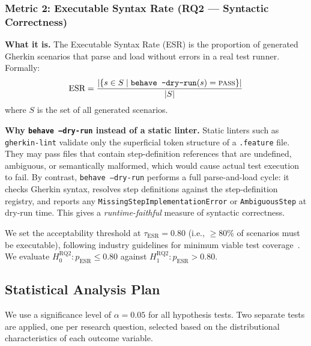 \subsubsection{Metric 2: Executable Syntax Rate (RQ2 — Syntactic Correctness)}
\label{sec:metric-esr}

\textbf{What it is.}
The Executable Syntax Rate (ESR) is the proportion of generated Gherkin scenarios that
parse and load without errors in a real test runner.
Formally:
\begin{equation}
  \text{ESR} = \frac{|\{s \in S \mid \texttt{behave --dry-run}(s) = \textsc{pass}\}|}{|S|}
\label{eq:esr}
\end{equation}
where $S$ is the set of all generated scenarios.

\textbf{Why \texttt{behave --dry-run} instead of a static linter.}
Static linters such as \texttt{gherkin-lint} validate only the superficial token structure
of a \texttt{.feature} file.
They may pass files that contain step-definition references that are undefined, ambiguous,
or semantically malformed, which would cause actual test execution to fail.
By contrast, \texttt{behave --dry-run} performs a full parse-and-load cycle: it checks
Gherkin syntax, resolves step definitions against the step-definition registry, and reports
any \texttt{MissingStepImplementationError} or \texttt{AmbiguousStep} at dry-run time.
This gives a \emph{runtime-faithful} measure of syntactic correctness.

We set the acceptability threshold at $\tau_{\text{ESR}} = 0.80$ (i.e., $\geq$80\% of
scenarios must be executable), following industry guidelines for minimum viable test
coverage~\cite{wohlin2012experimentation}.
We evaluate $H_0^{\text{RQ2}}: p_{\text{ESR}} \leq 0.80$ against
$H_1^{\text{RQ2}}: p_{\text{ESR}} > 0.80$.

\subsection{Statistical Analysis Plan}
\label{sec:stats}

We use a significance level of $\alpha = 0.05$ for all hypothesis tests.
Two separate tests are applied, one per research question, selected based on the
distributional characteristics of each outcome variable.

